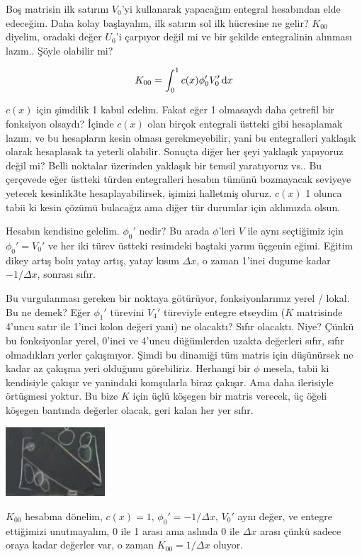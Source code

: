 \documentclass[12pt,fleqn]{article}\usepackage{../../common}
\begin{document}
Boş matrisin ilk satırını $V_0$'yi kullanarak yapacağım entegral hesabından elde
edeceğim. Daha kolay başlayalım, ilk satırın sol ilk hücresine ne gelir?
$K_{00}$ diyelim, oradaki değer $U_0$'i çarpıyor değil mi ve bir şekilde
entegralinin alınması lazım.. Şöyle olabilir mi?

$$
K_{00} = \int_{0}^{1} c(x) \phi_0' V_0' \,\mathrm{d} x
$$

$c(x)$ için şimdilik 1 kabul edelim. Fakat eğer 1 olmasaydı daha çetrefil bir
fonksiyon olsaydı? İçinde $c(x)$ olan birçok entegrali üstteki gibi hesaplamak
lazım, ve bu hesapların kesin olması gerekmeyebilir, yani bu entegralleri
yaklaşık olarak hesaplasak ta yeterli olabilir. Sonuçta diğer her şeyi yaklaşık
yapıyoruz değil mi? Belli noktalar üzerinden yaklaşık bir temsil yaratıyoruz
vs.. Bu çerçevede eğer üstteki türden entegralleri hesabın tümünü bozmayacak
seviyeye yetecek kesinlik3te hesaplayabilirsek, işimizi halletmiş oluruz. $c(x)$
1 olunca tabii ki kesin çözümü bulacağız ama diğer tür durumlar için aklımızda
olsun.

Hesabın kendisine gelelim. $\phi_0'$ nedir? Bu arada $\phi$'leri $V$ ile aynı
seçtiğimiz için $\phi_0' = V_0'$ ve her iki türev üstteki resimdeki baştaki
yarım üçgenin eğimi. Eğitim dikey artış bolu yatay artış, yatay kısım $\Delta
x$, o zaman 1'inci dugume kadar $- 1 / \Delta x$, sonrası sıfır.

Bu vurgulanması gereken bir noktaya götürüyor, fonksiyonlarımız yerel / lokal.
Bu ne demek? Eğer $\phi_1'$ türevini $V_4'$ türeviyle entegre etseydim ($K$
matrisinde 4'uncu satır ile 1'inci kolon değeri yani) ne olacaktı? Sıfır
olacaktı. Niye? Çünkü bu fonksiyonlar yerel, 0'inci ve 4'uncu düğümlerden uzakta
değerleri sıfır, sıfır olmadıkları yerler çakışmıyor. Şimdi bu dinamiği tüm
matris için düşünürsek ne kadar az çakışma yeri olduğunu görebiliriz. Herhangi
bir $\phi$ mesela, tabii ki kendisiyle çakışır ve yanindaki komşularla biraz
çakışır. Ama daha ilerisiyle örtüşmesi yoktur. Bu bize $K$ için üçlü köşegen bir
matris verecek, üç öğeli köşegen bantında değerler olacak, geri kalan her yer
sıfır.

\includegraphics[width=10em]{compscieng_1_18_06.png}

$K_{00}$ hesabına dönelim, $c(x)=1$, $\phi_0' = -1/\Delta x$, $V_0'$ aynı değer,
ve entegre ettiğimizi unutmayalım, 0 ile 1 arası ama aslında 0 ile $\Delta x$
arası çünkü sadece oraya kadar değerler var, o zaman $K_{00} = 1/\Delta x$
oluyor.
\end{document}
